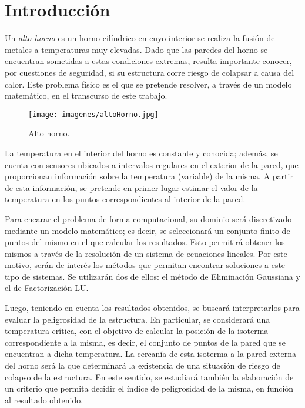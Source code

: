 \section{Introducción}

  Un \emph{alto horno} es un horno cilíndrico en cuyo interior se realiza la fusión de metales a temperaturas muy elevadas. Dado que las paredes del horno se encuentran sometidas a estas condiciones extremas, resulta importante conocer, por cuestiones de seguridad, si su estructura corre riesgo de colapsar a causa del calor. Este problema físico es el que se pretende resolver, a través de un modelo matemático, en el transcurso de este trabajo.

  \begin{figure}[h]
    \centering
    \texttt{[image: imagenes/altoHorno.jpg]}
    \caption{Alto horno.} \label{fig:alto-horno}
  \end{figure}

  La temperatura en el interior del horno es constante y conocida; además, se cuenta con sensores ubicados a intervalos regulares en el exterior de la pared, que proporcionan información sobre la temperatura (variable) de la misma. A partir de esta información, se pretende en primer lugar estimar el valor de la temperatura en los puntos correspondientes al interior de la pared.

  Para encarar el problema de forma computacional, su dominio será discretizado mediante un modelo matemático; es decir, se seleccionará un conjunto finito de puntos del mismo en el que calcular los resultados. Esto permitirá obtener los mismos a través de la resolución de un sistema de ecuaciones lineales. Por este motivo, serán de interés los métodos que permitan encontrar soluciones a este tipo de sistemas. Se utilizarán dos de ellos: el método de Eliminación Gaussiana y el de Factorización LU.

  Luego, teniendo en cuenta los resultados obtenidos, se buscará interpretarlos para evaluar la peligrosidad de la estructura. En particular, se considerará una temperatura crítica, con el objetivo de calcular la posición de la isoterma correspondiente a la misma, es decir, el conjunto de puntos de la pared que se encuentran a dicha temperatura. La cercanía de esta isoterma a la pared externa del horno será la que determinará la existencia de una situación de riesgo de colapso de la estructura. En este sentido, se estudiará también la elaboración de un criterio que permita decidir el índice de peligrosidad de la misma, en función al resultado obtenido.
